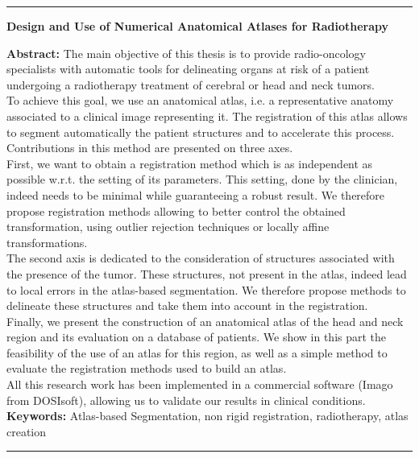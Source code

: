 \documentclass[a4paper,11pt,twoside]{ThesisStyle}
\begin{document}
\cleardoublepage
\begin{vcenterpage}
\noindent\rule[2pt]{\textwidth}{0.5pt}
\begin{center}
{\large\textbf{Design and Use of Numerical Anatomical Atlases for Radiotherapy\\}}
\end{center}
{\large\textbf{Abstract:}}
The main objective of this thesis is to provide radio-oncology specialists with automatic tools for delineating organs at risk of a patient undergoing a radiotherapy treatment of cerebral or head and neck tumors.
\\
To achieve this goal, we use an anatomical atlas, i.e. a representative anatomy associated to a clinical image representing it. The registration of this atlas allows to segment automatically the patient structures and to accelerate this process. Contributions in this method are presented on three axes.
\\
First, we want to obtain a registration method which is as independent as possible w.r.t. the setting of its parameters. This setting, done by the clinician, indeed needs to be minimal while guaranteeing a robust result. We therefore propose registration methods allowing to better control the obtained transformation, using outlier rejection techniques or locally affine transformations.
\\
The second axis is dedicated to the consideration of structures associated with the presence of the tumor. These structures, not present in the atlas, indeed lead to local errors in the atlas-based segmentation. We therefore propose methods to delineate these structures and take them into account in the registration.
\\
Finally, we present the construction of an anatomical atlas of the head and neck region and its evaluation on a database of patients. We show in this part the feasibility of the use of an atlas for this region, as well as a simple method to evaluate the registration methods used to build an atlas.
\\
All this research work has been implemented in a commercial software (Imago from DOSIsoft), allowing us to validate our results in clinical conditions.
\\
{\large\textbf{Keywords:}}
Atlas-based Segmentation, non rigid registration, radiotherapy, atlas creation
\\
\noindent\rule[2pt]{\textwidth}{0.5pt}
\end{vcenterpage}
\end{document}

